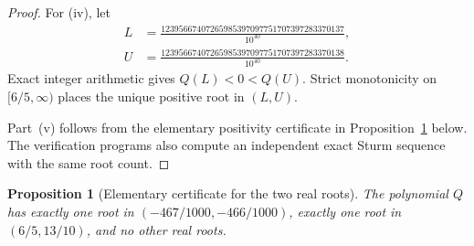 \documentclass[11pt]{article}
\newtheorem{proposition}[theorem]{Proposition}
\theoremstyle{remark}
\begin{document}
\begin{proof}
For (iv), let
\begin{align*}
L&=\frac{12395667407265985397097751707397283370137}{10^{40}},\\
U&=\frac{12395667407265985397097751707397283370138}{10^{40}}.
\end{align*}
Exact integer arithmetic gives \(Q(L)<0<Q(U)\). Strict monotonicity on \([6/5,\infty)\) places the unique positive root in \((L,U)\).

Part~(v) follows from the elementary positivity certificate in Proposition~\ref{prop:two-roots} below. The verification programs also compute an independent exact Sturm sequence with the same root count.
\end{proof}


\begin{proposition}[Elementary certificate for the two real roots]\label{prop:two-roots}
The polynomial \(Q\) has exactly one root in
\( (-467/1000,-466/1000) \), exactly one root in \( (6/5,13/10) \), and no other real roots.
\end{proposition}
\end{document}
